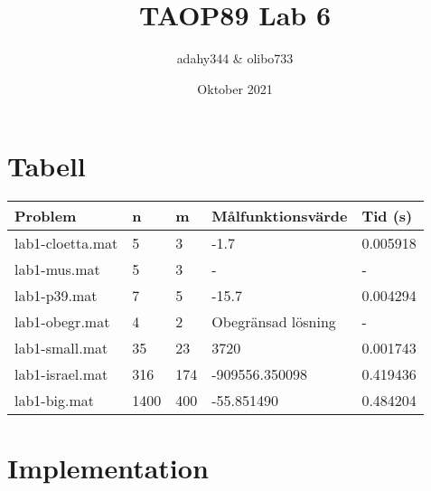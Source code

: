 \documentclass{article}
\title{TAOP89 Lab 6}
\author{adahy344 \& olibo733}
\date{Oktober 2021}
\begin{document}
\maketitle

\section{Tabell}
\begin{center}
\begin{tabular}{ |p{3cm}|p{0.5cm}|p{0.5cm}|p{3cm}|p{2cm}|  }
\hline
Problem & n & m & Målfunktionsvärde & Tid (s)\\
\hline
lab1-cloetta.mat & 5 & 3 & -1.7 & 0.005918\\
lab1-mus.mat & 5 & 3 & - & -\\
lab1-p39.mat & 7 & 5 & -15.7 & 0.004294\\
lab1-obegr.mat & 4 & 2 & Obegränsad lösning & -\\
lab1-small.mat & 35 & 23 & 3720 & 0.001743\\
lab1-israel.mat & 316 & 174 & -909556.350098 & 0.419436\\
lab1-big.mat & 1400 & 400 & -55.851490 & 0.484204\\
\hline
\end{tabular}
\end{center}

\section{Implementation}
\end{document}
